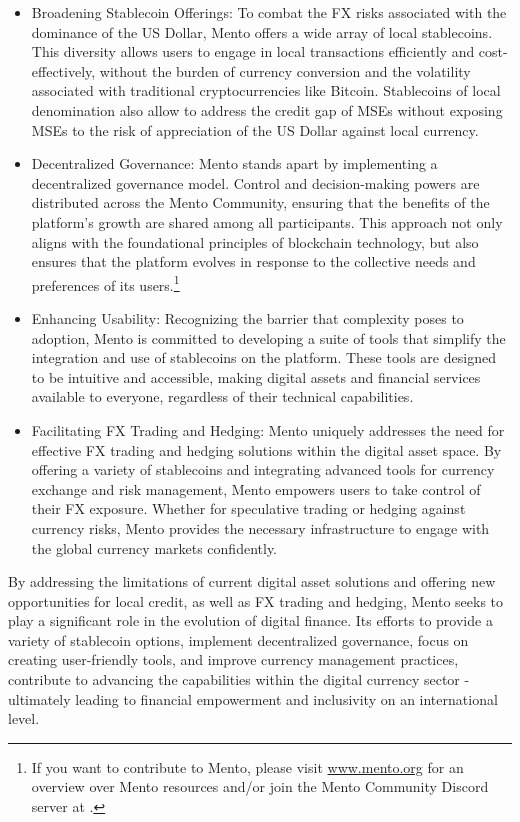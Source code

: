 \documentclass[a4paper]{article}
\theoremstyle{definition}
\begin{document}
\begin{itemize}
    \item Broadening Stablecoin Offerings: To combat the FX risks associated with the dominance of the US Dollar, Mento offers a wide array of local stablecoins. This diversity allows users to engage in local transactions efficiently and cost-effectively, without the burden of currency conversion and the volatility associated with traditional cryptocurrencies like Bitcoin. Stablecoins of local denomination also allow to address the credit gap of MSEs without exposing MSEs to the risk of appreciation of the US Dollar against local currency.
    
    \item Decentralized Governance: Mento stands apart by implementing a decentralized governance model. Control and decision-making powers are distributed across the Mento Community, ensuring that the benefits of the platform's growth are shared among all participants. This approach not only aligns with the foundational principles of blockchain technology, but also ensures that the platform evolves in response to the collective needs and preferences of its users.\footnote{If you want to contribute to Mento, please visit \url{www.mento.org} for an overview over Mento resources and/or join the Mento Community Discord server at \cite{mento_discord}.}
    
    \item Enhancing Usability: Recognizing the barrier that complexity poses to adoption, Mento is committed to developing a suite of tools that simplify the integration and use of stablecoins on the platform. These tools are designed to be intuitive and accessible, making digital assets and financial services available to everyone, regardless of their technical capabilities.
    
    \item Facilitating FX Trading and Hedging: Mento uniquely addresses the need for effective FX trading and hedging solutions within the digital asset space. By offering a variety of stablecoins and integrating advanced tools for currency exchange and risk management, Mento empowers users to take control of their FX exposure. Whether for speculative trading or hedging against currency risks, Mento provides the necessary infrastructure to engage with the global currency markets confidently.
\end{itemize}

By addressing the limitations of current digital asset solutions and offering new opportunities for local credit, as well as FX trading and hedging, Mento seeks to play a significant role in the evolution of digital finance. Its efforts to provide a variety of stablecoin options, implement decentralized governance, focus on creating user-friendly tools, and improve currency management practices, contribute to advancing the capabilities within the digital currency sector - ultimately leading to financial empowerment and inclusivity on an international level.
\end{document}
